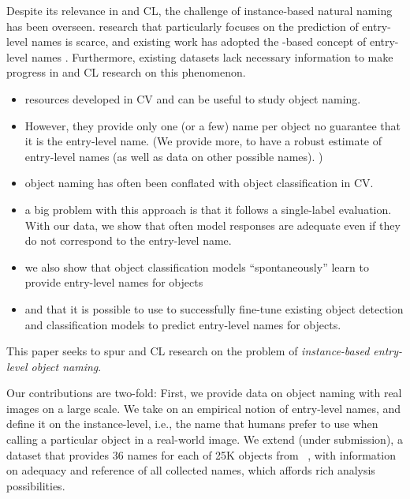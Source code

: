 %
%

Despite its relevance in \lv and CL, the challenge of instance-based natural naming has been overseen. 
\lv research that particularly focuses on the prediction of entry-level names is scarce, and existing work has adopted the \category-based concept of entry-level names \cite{Ordonez:2016}. 
Furthermore, existing datasets lack necessary information to make progress in \lv and CL research on this phenomenon. 
\begin{itemize}
	\item resources developed in CV and \lv can be useful to study object naming. 
	\item However, they provide only one (or a few) name per object \ra no guarantee that it is the entry-level name. (We provide more, to have a robust estimate of entry-level names (as well as data on other possible names). )
	\item object naming has often been conflated with object classification in CV. 
	\item a big problem with this approach is that it follows a single-label evaluation. With our data, we show that often model responses are adequate even if they do not correspond to the entry-level name.
	\item we also show that object classification models ``spontaneously'' learn to provide entry-level names for objects
	\item and that it is possible to use \mn to successfully fine-tune existing object detection and classification models to predict entry-level names for objects.
\end{itemize}


This paper seeks to spur \lv and CL research on the problem of \textit{instance-based entry-level object naming}. 

Our contributions are two-fold:  
First, we provide data on object naming with real images on a large scale. 
We take on an empirical notion of entry-level names, and define it on the instance-level, i.e., the name that humans prefer to use when calling a particular object in a real-world image.   
We extend \mn (under submission), a dataset that provides 36 names for each of 25K objects from \vg~\cite{+++}, with information on adequacy and reference of all collected names, which affords rich analysis possibilities. 

